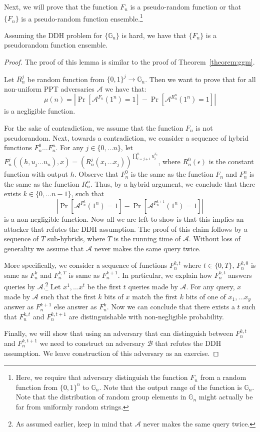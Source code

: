 Next, we will prove that the function $F_n$ is a pseudo-random function or that $\{F_n\}$ is a pseudo-random function ensemble.\footnote{Here, we require that adversary distinguish the function $F_n$ from a random function from $\{0,1\}^n$ to $\mathbb{G}_n$. Note that the output range of the function is $\mathbb{G}_n$. Note that the distribution of random group elements in $\mathbb{G}_n$ might actually be far from uniformly random strings.}
\begin{lemma}
Assuming the DDH problem for $\{\mathbb{G}_n\}$ is hard, we have that $\{F_n\}$ is a pseudorandom function ensemble.
\end{lemma}
\begin{proof}
The proof of this lemma is similar to the proof of Theorem~\ref{theorem:ggm}.

Let $R_n^j$ be random function from $\{0,1\}^j \rightarrow \mathbb{G}_n$. Then we want to prove that for all non-uniform PPT adversaries $\mathcal{A}$ we have that:
\[\mu(n) = \left|\Pr[\mathcal{A}^{F_n}(1^n) =1] -  \Pr[\mathcal{A}^{R_n^n}(1^n) =1]\right|\]
is a negligible function. 

For the sake of contradiction, we assume that the function $F_n$ is not pseudorandom. Next, towards a contradiction, we consider a sequence of hybrid functions $F_n^0 \ldots F_n^n$. 
For any $j \in \{0,\ldots n\}$, let $F^j_n((h,u_{j}\ldots u_n),x) = (R_n^j(x_1\ldots x_j))^{\prod_{i=j+1}^n u_i^{x_i}}$, where $R_n^0(\epsilon)$ is the constant function with output $h$. Observe that $F_n^0$ is the same as the function $F_n$ and $F_n^n$ is the same as the function $R_n^n$. Thus, by a hybrid argument, we conclude that there exists $k \in \{0,\ldots n-1\}$, such that 
\[\left|\Pr[\mathcal{A}^{F_n^k}(1^n) =1] -  \Pr[\mathcal{A}^{F_n^{k+1}}(1^n) =1]\right|\]
is a non-negligible function. Now all we are left to show is that this implies an attacker that refutes the DDH assumption. The proof of this claim follows by a sequence of $T$ sub-hybrids, where $T$ is the running time of $\mathcal{A}$. Without loss of generality we assume that $\mathcal{A}$ never makes the same query twice. 

More specifically, we consider a sequence of functions $F_n^{k,t}$ where $t \in \{0,T\}$, $F_n^{k,0}$ is same as $F_n^{k}$ and $F_n^{k,T}$ is same as $F_n^{k+1}$. In particular, we explain how $F_n^{k,t}$ answers queries by $\mathcal{A}$.\footnote{As assumed earlier, keep in mind that $\mathcal{A}$ never makes the same query twice.} Let $x^1, \ldots x^t$ be the first $t$ queries made by $\mathcal{A}$. For any query, $x$ made by $\mathcal{A}$ such that the first $k$ bits of $x$ match the first $k$ bits of one of $x_1, \ldots x_y$ answer as $F_n^{k+1}$ else answer as $F_n^{k}$. Now we can conclude that there exists a $t$ such that $F_n^{k,t}$ and $F_n^{k,t+1}$ are distinguishable with non-negligible probability. 

Finally, we will show that using an adversary that can distinguish between $F_n^{k,t}$ and $F_n^{k,t+1}$ we need to construct an adversary $\mathcal{B}$ that refutes the DDH assumption. We leave construction of this adversary as an exercise.
\end{proof}